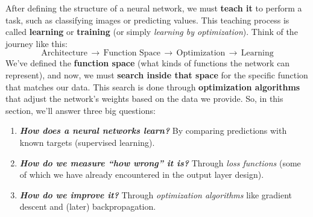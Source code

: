 \highspace
After defining the structure of a neural network, we must \textbf{teach it} to perform a task, such as classifying images or predicting values. This teaching process is called \textbf{learning} or \textbf{training} (or simply \emph{learning by optimization}). Think of the journey like this:
\begin{equation*}
    \text{Architecture} \, \rightarrow \,
    \text{Function Space} \, \rightarrow \,
    \text{Optimization} \, \rightarrow \,
    \text{Learning}
\end{equation*}
We've defined the \textbf{function space} (what kinds of functions the network can represent), and now, we must \textbf{search inside that space} for the specific function that matches our data. This search is done through \textbf{optimization algorithms} that adjust the network's weights based on the data we provide. So, in this section, we'll answer three big questions:
\begin{enumerate}
    \item \emph{\textbf{How does a neural networks learn?}} By comparing predictions with known targets (supervised learning).
    \item \emph{\textbf{How do we measure ``how wrong'' it is?}} Through \emph{loss functions} (some of which we have already encountered in the output layer design).
    \item \emph{\textbf{How do we improve it?}} Through \emph{optimization algorithms} like gradient descent and (later) backpropagation.
\end{enumerate}
